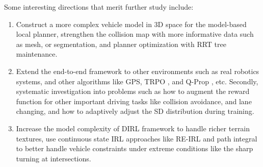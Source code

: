\documentclass[../thesis.tex]{subfiles}
\begin{document}

Some interesting directions that merit further study include:
\begin{enumerate}
	\item 
	Construct a more complex vehicle model in 3D space for the model-based local planner, strengthen the collision map with more informative data such as mesh, or segmentation, and planner optimization with RRT tree maintenance.

	\item
	Extend the end-to-end framework to other environments such as real robotics systems, and other algorithms like GPS\cite{levine2013guided}, TRPO \cite{TRPO}, and Q-Prop \cite{DBLP:journals/corr/GuLGTL16}, etc. Secondly, systematic investigation into problems such as how to augment the reward function for other important driving tasks like collision avoidance, and lane changing, and how to adaptively adjust the SD distribution during training. 

	\item
	Increase the model complexity of DIRL framework to handle richer terrain textures, use continuous state IRL approaches like RE-IRL \cite{boularias2011relative} and path integral \cite{aghasadeghi2011maximum} to better handle vehicle constraints under extreme conditions like the sharp turning at intersections.

\end{enumerate}
\end{document}

